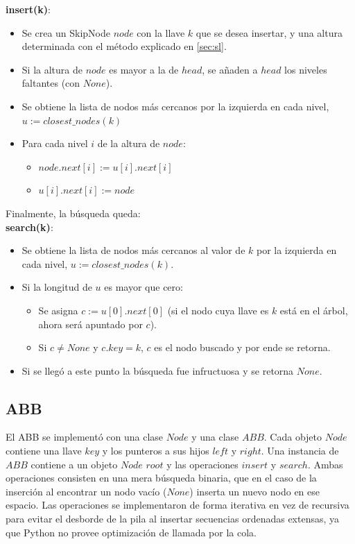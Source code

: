 \documentclass[12pt,letterpaper]{article}
\begin{document}
\textbf{insert(k)}:
\begin{itemize}
\item	Se crea un SkipNode $node$ con la llave $k$ que se desea insertar, y una altura determinada con el método explicado en \ref{sec:sl}.
\item	Si la altura de $node$ es mayor a la de $head$, se añaden a $head$ los niveles faltantes (con $None$).
\item	Se obtiene la lista de nodos más cercanos por la izquierda en cada nivel, $u := closest\_nodes(k)$
\item	Para cada nivel $i$ de la altura de $node$:
	\begin{itemize}
	\item	$node.next[i] := u[i].next[i]$
	\item	$u[i].next[i] := node$
	\end{itemize}
\end{itemize}

\vspace{0.5cm}
Finalmente, la búsqueda queda:\\

\textbf{search(k)}:
\begin{itemize}
\item	Se obtiene la lista de nodos más cercanos al valor de $k$ por la izquierda en cada nivel, $u := closest\_nodes(k)$.
\item	Si la longitud de $u$ es mayor que cero:
	\begin{itemize}
	\item	Se asigna $c := u[0].next[0]$ (si el nodo cuya llave es $k$ está en el árbol, ahora será apuntado por $c$).
	\item	Si $c \not = None$ y $c.key = k$, $c$ es el nodo buscado y por ende se retorna.
	\end{itemize}
\item	Si se llegó a este punto la búsqueda fue infructuosa y se retorna $None$.
\end{itemize}

\subsection{ABB}
El ABB se implementó con una clase $Node$ y una clase $ABB$. Cada objeto $Node$ contiene una llave $key$ y los punteros a sus hijos $left$ y $right$. Una instancia de $ABB$ contiene a un objeto $Node$ $root$ y las operaciones $insert$ y $search$. Ambas operaciones consisten en una mera búsqueda binaria, que en el caso de la inserción al encontrar un nodo vacío ($None$) inserta un nuevo nodo en ese espacio. Las operaciones se implementaron de forma iterativa en  vez de recursiva para evitar el desborde de la pila al insertar secuencias ordenadas extensas, ya que Python no provee optimización de llamada por la cola.
\end{document}
